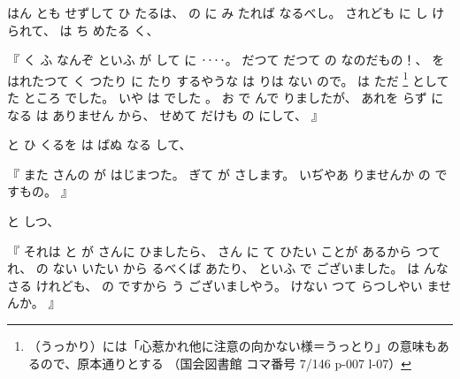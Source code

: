 
%
はん
とも
せずして
ひ
たるは、
%
の
に
み
たれば
なるべし。
%
されども
に
し
けられて、
%
は
ち
めたる
く、

%
『
く
ふ
なんぞ
といふ
が
して
に
‥‥。
%
だつて
だつて
の
なのだもの！、
%
を
はれたつて
く
つたり
に
たり
するやうな
は
りは
ない
ので。
%
は
ただ%
\footnote{（うっかり）には「心惹かれ他に注意の向かない様＝うっとり」の意味もあるので、原本通りとする %
（国会図書館 コマ番号 7/146 p-007 l-07）}%
として
た
ところ
でした。
%
いや
は
でした
。
%
%
お
で
んで
りましたが、
%
あれを
らず
に
なる
は
ありません
から、
%
せめて
だけも
の
にして、
』

%
と
ひ
くるを
は%
ばぬ
なる
して、

%
『
また
さんの
が
はじまつた。
%
ぎて
が
さします。
%
いぢやあ
りませんか
の
ですもの。
』

%
と
しつ、

%
『
それは
と
が
さんに
ひましたら、
%
さん
に
て
ひたい
ことが
あるから
つて
れ、
%
の
ない
いたい
から
るべくば
あたり、
%
といふ
で
ございました。
%
は
んなさる
けれども、
%
の
ですから
う
ございましやう。
%
けない
つて
らつしやい
ませんか。
』

